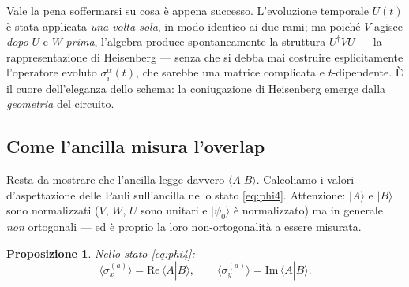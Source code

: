\documentclass[11pt,a4paper]{article}
\newtheorem{proposizione}{Proposizione}
\begin{document}
Vale la pena soffermarsi su cosa è appena successo. L'evoluzione temporale $U(t)$ è stata
applicata \emph{una volta sola}, in modo identico ai due rami; ma poiché $V$ agisce
\emph{dopo} $U$ e $W$ \emph{prima}, l'algebra produce spontaneamente la struttura
$U^\dagger V U$ --- la rappresentazione di Heisenberg --- senza che si debba mai costruire
esplicitamente l'operatore evoluto $\sigma_i^\alpha(t)$, che sarebbe una matrice complicata e
$t$-dipendente. È il cuore dell'eleganza dello schema: la coniugazione di Heisenberg emerge
dalla \emph{geometria} del circuito.

\subsection{Come l'ancilla misura l'overlap}

Resta da mostrare che l'ancilla legge davvero $\langle A|B\rangle$. Calcoliamo i valori
d'aspettazione delle Pauli sull'ancilla nello stato \eqref{eq:phi4}. Attenzione: $|A\rangle$ e
$|B\rangle$ sono normalizzati ($V$, $W$, $U$ sono unitari e $|\psi_0\rangle$ è normalizzato) ma
in generale \emph{non} ortogonali --- ed è proprio la loro non-ortogonalità a essere misurata.

\begin{proposizione}
Nello stato \eqref{eq:phi4}:
\begin{equation}
\langle\sigma_x^{(a)}\rangle=\mathrm{Re}\,\langle A|B\rangle,
\qquad
\langle\sigma_y^{(a)}\rangle=\mathrm{Im}\,\langle A|B\rangle .
\end{equation}
\end{proposizione}
\end{document}
